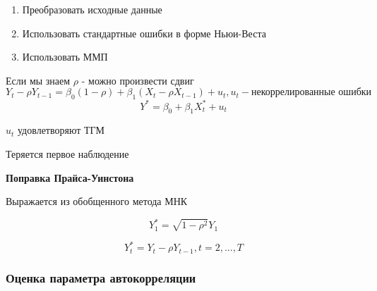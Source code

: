 \documentclass[a4paper, 12pt]{article}
\begin{document}
\begin{enumerate}
    \item Преобразовать исходные данные
    \item Использовать стандартные ошибки в форме Ньюи-Веста
    \item Использовать ММП
\end{enumerate}

Если мы знаем $\rho$ - можно произвести сдвиг 
\[Y_{t} - \rho Y_{t - 1} = \beta_{0}(1 - \rho) + \beta_{1}(X_{t} - \rho X_{t - 1}) + u_{t}, u_{t} - \textrm{некоррелированные ошибки}\]
\[Y^{*} = \beta_{0} + \beta_{1}X_{t}^{*} + u_{t}\]

$u_{t}$ удовлетворяют ТГМ

Теряется первое наблюдение

\textbf{Поправка Прайса-Уинстона}

Выражается из обобщенного метода МНК

\[Y^{*}_{1} = \sqrt{1 - \rho^{2}}Y_{1}\]

\[Y^{*}_{t} = Y_{t} - \rho Y_{t - 1}, t = 2, ..., T\]

\subsubsection{Оценка параметра автокорреляции}
\end{document}
